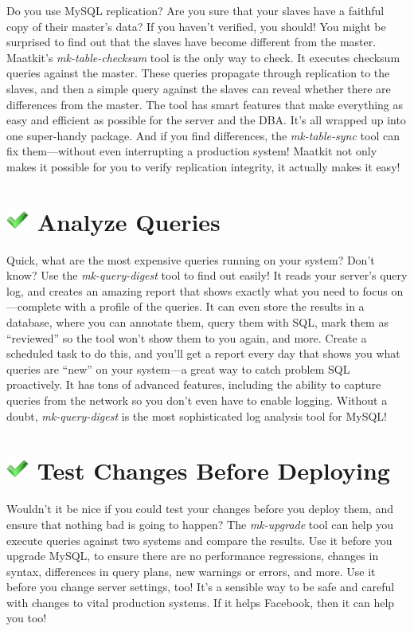 \documentclass[letterpaper,twoside,12pt]{article}
\begin{document}
Do you use MySQL replication?  Are you sure that your slaves have a faithful
copy of their master's data?  If you haven't verified, you should!  You might be
surprised to find out that the slaves have become different from the
master.  Maatkit's \emph{mk-table-checksum} tool is the only way to check.  It
executes checksum queries against the master.  These queries propagate through
replication to the slaves, and then a simple query against the slaves can reveal
whether there are differences from the master.  The tool has smart features
that make everything as easy and efficient as possible for
the server and the DBA.  It's all wrapped up into one super-handy package.  And
if you find differences, the \emph{mk-table-sync} tool can fix them---without
even interrupting a production system!  Maatkit not only makes it possible for
you to verify replication integrity, it actually makes it easy!

\section*{\includegraphics[width=1em]{../image/success} Analyze Queries}

Quick, what are the most expensive queries running on your system?  Don't know?
Use the \emph{mk-query-digest} tool to find out easily!  It reads your server's
query log, and creates an amazing report that shows exactly what you
need to focus on---complete with a profile of the queries.  It can even store
the results in a database, where you can annotate them, query them with SQL,
mark them as ``reviewed'' so the tool won't show them to you again, and more.
Create a scheduled task to do this, and you'll get a report every day that shows
you what queries are ``new'' on your system---a great way to catch problem SQL
proactively.  It has tons of advanced features, including the ability to capture
queries from the network so you don't even have to enable logging.  Without a
doubt, \emph{mk-query-digest} is the most sophisticated log analysis tool 
for MySQL!

\section*{\includegraphics[width=1em]{../image/success} Test Changes Before
Deploying}

Wouldn't it be nice if you could test your changes before you deploy them, and
ensure that nothing bad is going to happen?  The \emph{mk-upgrade} tool can help
you execute queries against two systems and compare the results.  Use it before
you upgrade MySQL, to ensure there are no performance regressions, changes in
syntax, differences in query plans, new warnings or errors, and more.  Use it
before you change server settings, too!  It's a sensible way to be safe and
careful with changes to vital production systems.  If it helps Facebook, then
it can help you too!
\end{document}
